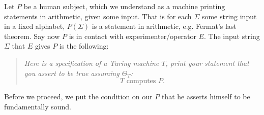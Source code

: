 \documentclass[9pt,twocolumn,twoside,lineno]{pnas-new}
\newenvironment{itquote}
  {\begin{quote}\itshape}
  {\end{quote}\ignorespacesafterend}
\numberwithin{equation}{section}
\theoremstyle{definition}
\theoremstyle{remark}
\begin{document}
Let $P$ be a human subject, which we understand as a machine printing statements in arithmetic, given some input. That is for each $\Sigma$ some string input in a fixed alphabet, $P (\Sigma)$ is a statement in arithmetic, e.g.
Fermat's last theorem. Say now $P$ is in contact with experimenter/operator $E$. The input string $\Sigma$ that $E$ gives $P$ is the following: 
\begin{itquote}
Here is a specification of a Turing machine $T$,  print your statement that you assert to be true assuming $\Theta _{T} $:
\begin{equation} \label{eq:condition}
T \text{ computes } P.
\end{equation}
\end{itquote}
  
   Before we proceed, we put the condition on our $P$ that he asserts himself to be fundamentally sound.
\end{document}
